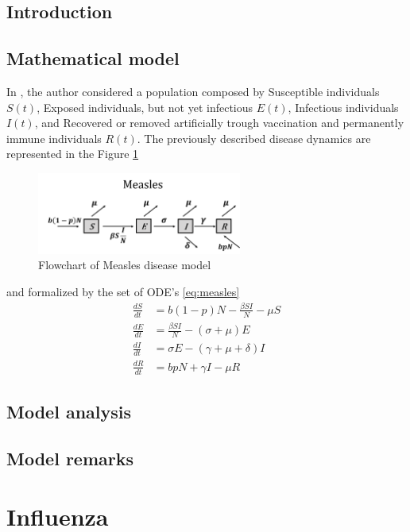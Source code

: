 \documentclass{book}
\begin{document}
\subsection*{Introduction}

\subsection*{Mathematical model}
In \cite{tessa2006mathematical}, the author considered a population composed by Susceptible individuals $S(t)$, Exposed individuals, but not yet infectious $E(t)$, Infectious individuals $I(t)$, and Recovered or removed artificially trough vaccination and permanently immune individuals $R(t)$.
%
The previously described disease dynamics are represented in the Figure \ref{fig:measles_flow}
\begin{figure}[H]
    \centering
    \includegraphics[width = 0.6\textwidth]{Flowcharts/measles.png}
    \caption{Flowchart of Measles disease model}
    \label{fig:measles_flow}
\end{figure}
%
and formalized by the set of ODE's \eqref{eq:measles}
\begin{equation}
\label{eq:measles}
\begin{aligned}
\frac{d S}{d t} &=b(1-p) N-\frac{\beta S I}{N}-\mu S \\
\frac{d E}{d t} &=\frac{\beta S I}{N}-(\sigma+\mu) E \\
\frac{d I}{d t} &=\sigma E-(\gamma+\mu+\delta) I \\
\frac{d R}{d t} &=b p N+\gamma I-\mu R
\end{aligned}
\end{equation}

\subsection*{Model analysis}
\subsection*{Model remarks}


\section{Influenza}
\end{document}
